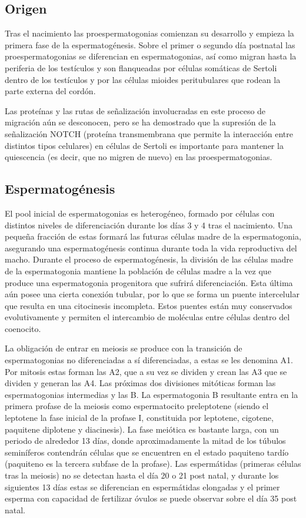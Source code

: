 \documentclass[a4paper,11pt]{article}
\begin{document}
\subsection{Origen}

Tras el nacimiento las proespermatogonias comienzan su desarrollo y empieza la primera fase de la espermatogénesis. Sobre el primer o segundo día postnatal las proespermatogonias se diferencian en espermatogonias, así como migran hasta la periferia de los testículos y son flanqueadas por células somáticas de Sertoli dentro de los testículos y por las células mioides peritubulares que rodean la parte externa del cordón.

Las proteínas y las rutas de señalización involucradas en este proceso de migración aún se desconocen, pero se ha demostrado que la supresión de la señalización NOTCH (proteína transmembrana que permite la interacción entre distintos tipos celulares) en células de Sertoli es importante para mantener la quiescencia (es decir, que no migren de nuevo) en las proespermatogonias.
\subsection{Espermatogénesis}
El pool inicial de espermatogonias es heterogéneo, formado por células con distintos niveles de diferenciación durante los días 3 y 4 tras el nacimiento. Una pequeña fracción de estas formará las futuras células madre de la espermatogonia, asegurando una espermatogénesis continua durante toda la vida reproductiva del macho. Durante el proceso de espermatogénesis, la división de las células madre de la espermatogonia mantiene la población de células madre a la vez que produce una espermatogonia progenitora que sufrirá diferenciación.  Esta última aún posee una cierta conexión tubular, por lo que se forma un puente intercelular que resulta en una citocinesis incompleta. Estos puentes están muy conservados evolutivamente y permiten el intercambio de moléculas entre células dentro del coenocito.

La obligación de entrar en meiosis se produce con la transición de espermatogonias no diferenciadas a sí diferenciadas, a estas se les denomina A1. Por mitosis estas forman las A2, que a su vez se dividen y crean las A3 que se dividen y generan las A4.  Las próximas dos divisiones mitóticas forman las espermatogonias intermedias y las B. La espermatogonia B resultante entra en la primera profase de la meiosis como espermatocito preleptotene (siendo el leptotene la fase inicial de la profase I, constituida por leptotene, cigotene, paquitene diplotene y diacinesis). La fase meiótica es bastante larga, con un periodo de alrededor 13 días, donde aproximadamente la mitad de los túbulos seminíferos contendrán células que se encuentren en el estado paquiteno tardío (paquiteno es la tercera subfase de la profase). Las espermátidas (primeras células tras la meiosis) no se detectan hasta el día 20 o 21 post natal, y durante los siguientes 13 días estas se diferencian en espermátidas elongadas y el primer esperma con capacidad de fertilizar óvulos se puede observar sobre el día 35 post natal.
\end{document}
